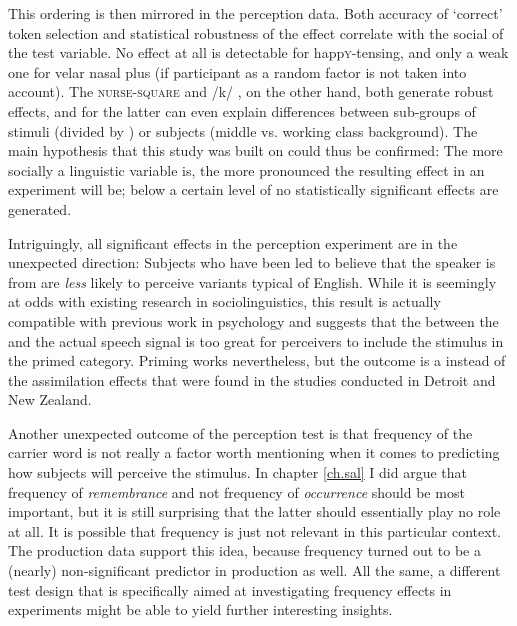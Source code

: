 This ordering is then mirrored in the perception data.
Both accuracy of `correct' token selection and statistical robustness of the  effect correlate with the social  of the test variable.
No effect at all is detectable for happ\textsc{y}-tensing, and only a weak one for velar nasal plus (if participant as a random factor is not taken into account).
The \textsc{nurse}-\textsc{square}  and /k/ , on the other hand, both generate robust  effects, and for the latter  can even explain differences between sub-groups of stimuli (divided by ) or subjects (middle vs. working class background).
The main hypothesis that this study was built on could thus be confirmed: The more socially  a linguistic variable is, the more pronounced the resulting effect in an   experiment will be; below a certain level of  no statistically significant  effects are generated.

Intriguingly, all significant effects in the perception experiment are in the unexpected direction: Subjects who have been led to believe that the speaker is from  are \emph{less} likely to perceive variants typical of  English.
While it is seemingly at odds with existing  research in sociolinguistics, this result is actually compatible with previous work in psychology and suggests that the  between the  and the actual speech signal is too great for perceivers to include the stimulus in the primed category.
Priming works nevertheless, but the outcome is a  instead of the assimilation effects that were found in the studies conducted in Detroit and New Zealand.

Another unexpected outcome of the perception test is that frequency of the carrier word is not really a factor worth mentioning when it comes to predicting how subjects will perceive the stimulus.
In chapter \ref{ch.sal} I did argue that frequency of \emph{remembrance} and not frequency of \emph{occurrence} should be most important, but it is still surprising that the latter should essentially play no role at all.
It is possible that frequency is just not relevant in this particular context.
The production data support this idea, because frequency turned out to be a (nearly) non-significant predictor in production as well.
All the same, a different test design that is specifically aimed at investigating frequency effects in  experiments might be able to yield further interesting insights.


